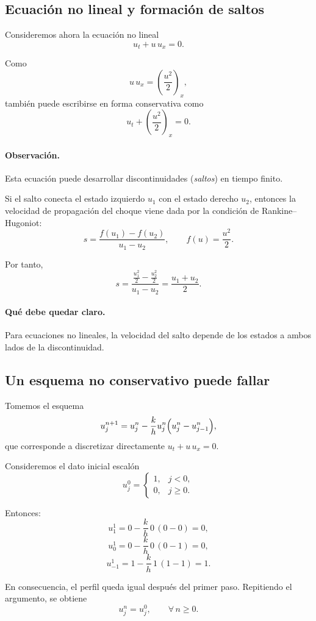 \subsection{Ecuación no lineal y formación de saltos}

Consideremos ahora la ecuación no lineal
\[
u_t+u\,u_x=0.
\]

Como
\[
u\,u_x=\left(\frac{u^2}{2}\right)_x,
\]
también puede escribirse en forma conservativa como
\[
u_t+\left(\frac{u^2}{2}\right)_x=0.
\]

\paragraph{Observación.}
Esta ecuación puede desarrollar discontinuidades (\emph{saltos}) en tiempo finito.

Si el salto conecta el estado izquierdo \(u_1\) con el estado derecho \(u_2\), entonces la velocidad de propagación del choque viene dada por la condición de Rankine--Hugoniot:
\[
s=\frac{f(u_1)-f(u_2)}{u_1-u_2},
\qquad
f(u)=\frac{u^2}{2}.
\]

Por tanto,
\[
s
=
\frac{\frac{u_1^2}{2}-\frac{u_2^2}{2}}{u_1-u_2}
=
\frac{u_1+u_2}{2}.
\]

\paragraph{Qué debe quedar claro.}
Para ecuaciones no lineales, la velocidad del salto depende de los estados a ambos lados de la discontinuidad.

\subsection{Un esquema no conservativo puede fallar}

Tomemos el esquema
\[
u_j^{n+1}
=
u_j^n-\frac{k}{h}u_j^n\Bigl(u_j^n-u_{j-1}^n\Bigr),
\]
que corresponde a discretizar directamente \(u_t+u\,u_x=0\).

Consideremos el dato inicial escalón
\[
u_j^0=
\begin{cases}
1, & j<0,\\
0, & j\ge 0.
\end{cases}
\]

Entonces:
\[
u_1^1
=
0-\frac{k}{h}\,0\,(0-0)=0,
\]
\[
u_0^1
=
0-\frac{k}{h}\,0\,(0-1)=0,
\]
\[
u_{-1}^1
=
1-\frac{k}{h}\,1\,(1-1)=1.
\]

En consecuencia, el perfil queda igual después del primer paso. Repitiendo el argumento, se obtiene
\[
u_j^n=u_j^0,
\qquad \forall\, n\ge 0.
\]

